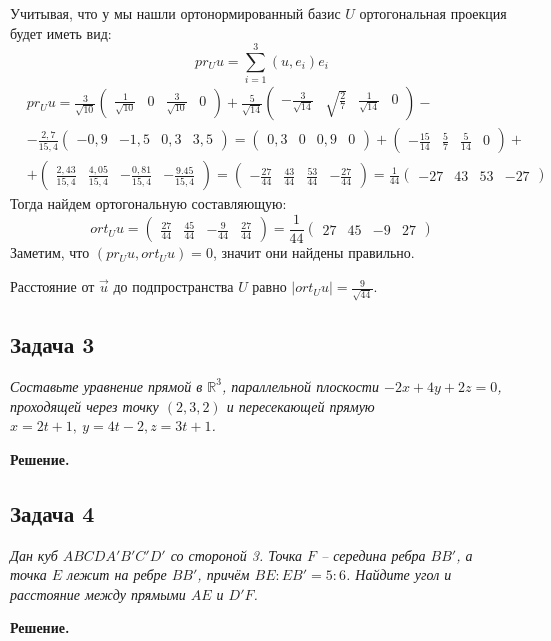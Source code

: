 	Учитывая, что у мы нашли ортонормированный базис $U$ ортогональная проекция будет иметь вид:
	\[
	pr_Uu = \sum_{i=1}^{3} (u, e_i)e_i
	\]
	\begin{align*}
	&pr_Uu = \frac{3}{\sqrt{10}}\begin{pmatrix} \frac{1}{\sqrt{10}} & 0 & \frac{3}{\sqrt{10}} & 0 \end{pmatrix} + \frac{5}{\sqrt{14}} \begin{pmatrix} -\frac{3}{\sqrt{14}} & \sqrt{\frac{2}{7}} & \frac{1}{\sqrt{14}} & 0 \end{pmatrix} -\\
	&- \frac{2,7}{15,4} \begin{pmatrix} -0,9 & -1,5 & 0,3 & 3,5 \end{pmatrix} = \begin{pmatrix} 0,3 & 0 & 0,9 & 0 \end{pmatrix} + \begin{pmatrix} -\frac{15}{14} & \frac{5}{7} & \frac{5}{14} & 0 \end{pmatrix} +\\
	&+ \begin{pmatrix} \frac{2,43}{15,4} & \frac{4,05}{15,4} & -\frac{0,81}{15,4} & -\frac{9.45}{15,4} \end{pmatrix} = \begin{pmatrix} -\frac{27}{44} & \frac{43}{44} & \frac{53}{44} & -\frac{27}{44} \end{pmatrix} = \frac{1}{44} \begin{pmatrix} -27 & 43 & 53 & -27 \end{pmatrix}
	\end{align*}
	Тогда найдем ортогональную составляющую:
	\[
	ort_Uu = \begin{pmatrix} \frac{27}{44} & \frac{45}{44} & -\frac{9}{44} & \frac{27}{44} \end{pmatrix} = \frac{1}{44} \begin{pmatrix} 27 & 45 & -9 & 27 \end{pmatrix}
	\]
	Заметим, что $(pr_Uu, ort_Uu) = 0$, значит они найдены правильно.
	
	Расстояние от $\vec u$ до подпространства $U$ равно $|ort_Uu| = \frac{9}{\sqrt{44}}$.
	
	
	\subsection{Задача 3} 
	\textit{Составьте уравнение прямой в $\mathbb{R}^3$, параллельной плоскости $-2x+4y+2z=0$, проходящей через точку $(2,3,2)$ и пересекающей прямую $x = 2t + 1,\ y = 4t - 2, z = 3t + 1$.}
	
	\textbf{Решение.}\\
	
	\subsection{Задача 4} 
	\textit{Дан куб $ABCDA'B'C'D'$ со стороной 3. Точка $F$ -- середина ребра $BB'$, а точка $E$ лежит на ребре $BB'$, причём $BE : EB' = 5 : 6$. Найдите угол и расстояние между прямыми $AE$ и $D'F$.}
	
	\textbf{Решение.}\\

	